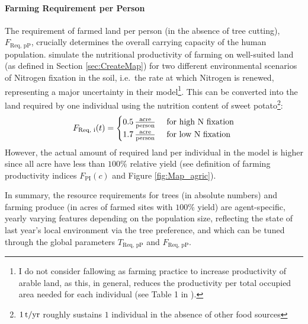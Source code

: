 \paragraph{Farming Requirement per Person}
The requirement of farmed land per person (in the absence of tree cutting), $F_\text{Req, pP}$, crucially determines the overall carrying capacity of the human population.
\citet{Puleston2017} simulate the nutritional productivity of farming on well-suited land (as defined in Section \ref{sec:CreateMap}) for two different environmental scenarios of Nitrogen fixation in the soil, i.e.\ the rate at which Nitrogen is renewed, representing a major uncertainty in their model\footnote{I do not consider fallowing as farming practice to increase productivity of arable land, as this, in general, reduces the productivity per total occupied area needed for each individual (see Table 1 in \citet{Puleston2017}).}.
This can be converted into the land required by one individual using the nutrition content of sweet potato\footnote{$1\, \rm{t/yr}$ roughly sustains $1$ individual in the absence of other food sources}: 
\begin{equation}
F_\text{Req, i}(t) = \begin{cases}
	0.5 \, {\rm \frac{acre}{person} } & \text{ for high N fixation} \\
	1.7 \, {\rm \frac{acre}{person} } & \text{ for low N fixation} \\
 \end{cases}
\end{equation}
However, the actual amount of required land per individual in the model is higher since all acre have less than $100\%$ relative yield (see definition of farming productivity indices $F_\text{PI}(c)$ and Figure \ref{fig:Map_agric}).

In summary, the resource requirements for trees (in absolute numbers) and farming produce (in acres of farmed sites with $100\%$ yield) are agent-specific, yearly varying features depending on the population size, reflecting the state of last year's local environment via the tree preference, and which can be tuned through the global parameters $T_\text{Req, pP}$ and $F_\text{Req, pP}$.


